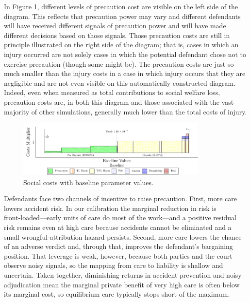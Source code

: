\documentclass{article}
\begin{document}
In Figure \ref{fig:baseline_costs}, different levels of precaution cost are visible on the left side of the diagram. This reflects that precaution power may vary and different defendants will have received different signals of precaution power and will have made different decisions based on those signals. Those precaution costs are still in principle illustrated on the right side of the diagram; that is, cases in which an injury occurred are not solely cases in which the potential defendant chose not to exercise precaution (though some might be). The precaution costs are just so much smaller than the injury costs in a case in which injury occurs that they are negligible and are not even visible on this automatically constructed diagram. Indeed, even when measured as total contributions to social welfare loss, precaution costs are, in both this diagram and those associated with the vast majority of other simulations, generally much lower than the total costs of injury. 

\begin{figure}[ht]
  \centering
  \includegraphics[width=0.85\textwidth]{../Figures/Cost Breakdown Baseline (Single Row).pdf}
  \caption{Social costs with baseline parameter values.}
  \label{fig:baseline_costs}
\end{figure}

Defendants face two channels of incentive to raise precaution. First, more care lowers accident risk. In our calibration the marginal reduction in risk is front‑loaded—early units of care do most of the work—and a positive residual risk remains even at high care because accidents cannot be eliminated and a small wrongful‑attribution hazard persists. Second, more care lowers the chance of an adverse verdict and, through that, improves the defendant’s bargaining position. That leverage is weak, however, because both parties and the court observe noisy signals, so the mapping from care to liability is shallow and uncertain. Taken together, diminishing returns in accident prevention and noisy adjudication mean the marginal private benefit of very high care is often below its marginal cost, so equilibrium care typically stops short of the maximum.
\end{document}
